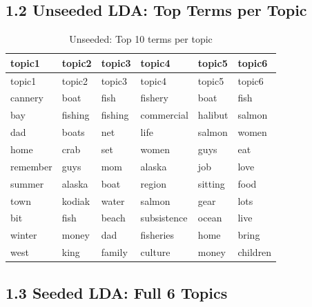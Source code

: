 \documentclass[
]{article}
\begin{document}
\subsection{1.2 Unseeded LDA: Top Terms per
Topic}\label{unseeded-lda-top-terms-per-topic}

\begin{longtable}[]{@{}llllll@{}}
\caption{Unseeded: Top 10 terms per topic}\tabularnewline
\toprule\noalign{}
topic1 & topic2 & topic3 & topic4 & topic5 & topic6 \\
\midrule\noalign{}
\endfirsthead
\toprule\noalign{}
topic1 & topic2 & topic3 & topic4 & topic5 & topic6 \\
\midrule\noalign{}
\endhead
\bottomrule\noalign{}
\endlastfoot
cannery & boat & fish & fishery & boat & fish \\
bay & fishing & fishing & commercial & halibut & salmon \\
dad & boats & net & life & salmon & women \\
home & crab & set & women & guys & eat \\
remember & guys & mom & alaska & job & love \\
summer & alaska & boat & region & sitting & food \\
town & kodiak & water & salmon & gear & lots \\
bit & fish & beach & subsistence & ocean & live \\
winter & money & dad & fisheries & home & bring \\
west & king & family & culture & money & children \\
\end{longtable}

\subsection{1.3 Seeded LDA: Full 6
Topics}\label{seeded-lda-full-6-topics}
\end{document}
